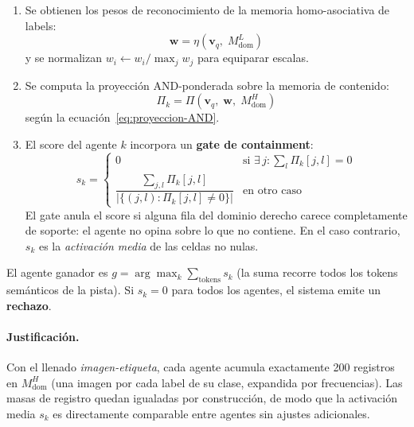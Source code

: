 \begin{enumerate}
    \item Se obtienen los pesos de reconocimiento de la memoria homo-asociativa de labels:
    \begin{equation}
        \mathbf{w} = \eta(\mathbf{v}_q,\; M^L_{\mathrm{dom}})
        \label{eq:pesos-routing}
    \end{equation}
    y se normalizan $w_i \leftarrow w_i / \max_j w_j$ para equiparar escalas.

    \item Se computa la proyección AND-ponderada sobre la memoria de contenido:
    \begin{equation}
        \Pi_k = \Pi(\mathbf{v}_q,\; \mathbf{w},\; M^H_{\mathrm{dom}})
        \label{eq:proyeccion-routing}
    \end{equation}
    según la ecuación~\eqref{eq:proyeccion-AND}.

    \item El score del agente $k$ incorpora un \textbf{gate de containment}:
    \begin{equation}
        s_k = \begin{cases}
            0 & \text{si } \exists\, j : \sum_l \Pi_k[j, l] = 0 \\[4pt]
            \dfrac{\displaystyle\sum_{j,l} \Pi_k[j, l]}%
                  {|\{(j,l) : \Pi_k[j,l] \neq 0\}|} & \text{en otro caso}
        \end{cases}
        \label{eq:score-gated}
    \end{equation}
    El gate anula el score si alguna fila del dominio derecho carece completamente
    de soporte: el agente no opina sobre lo que no contiene.
    En el caso contrario, $s_k$ es la \emph{activación media} de las celdas no nulas.
\end{enumerate}

El agente ganador es $g = \arg\max_k \sum_{\text{tokens}} s_k$ (la suma recorre todos
los tokens semánticos de la pista).
Si $s_k = 0$ para todos los agentes, el sistema emite un \textbf{rechazo}.

\paragraph{Justificación.}
Con el llenado \emph{imagen-etiqueta}, cada agente acumula exactamente 200 registros en
$M^H_{\mathrm{dom}}$ (una imagen por cada label de su clase, expandida por frecuencias).
Las masas de registro quedan igualadas por construcción, de modo que la activación media
$s_k$ es directamente comparable entre agentes sin ajustes adicionales.

